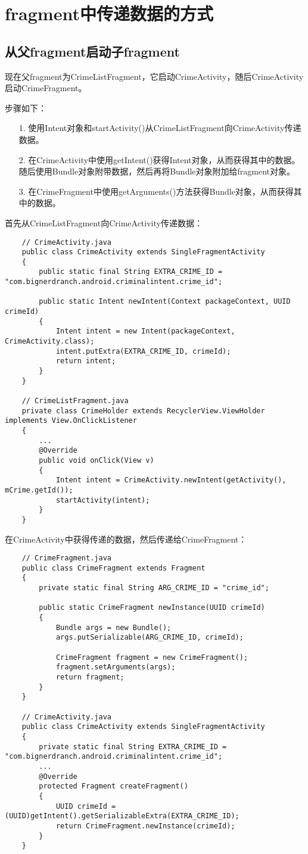 \documentclass[a4paper,left=2.5cm,right=2.5cm,11pt]{article}
\begin{document}


\section{fragment中传递数据的方式}
\subsection{从父fragment启动子fragment}
	现在父fragment为CrimeListFragment，它启动CrimeActivity，随后CrimeActivity启动CrimeFragment。\par

	步骤如下：
	\begin{itemize}
		\item[1.] 使用Intent对象和startActivity()从CrimeListFragment向CrimeActivity传递数据。
		\item[2.] 在CrimeActivity中使用getIntent()获得Intent对象，从而获得其中的数据。
		          随后使用Bundle对象附带数据，然后再将Bundle对象附加给fragment对象。
		\item[3.] 在CrimeFragment中使用getArguments()方法获得Bundle对象，从而获得其中的数据。
	\end{itemize}

	首先从CrimeListFragment向CrimeActivity传递数据：
	\begin{lstlisting}
	// CrimeActivity.java
	public class CrimeActivity extends SingleFragmentActivity
	{
		public static final String EXTRA_CRIME_ID = "com.bignerdranch.android.criminalintent.crime_id";

		public static Intent newIntent(Context packageContext, UUID crimeId)
		{
			Intent intent = new Intent(packageContext, CrimeActivity.class);
			intent.putExtra(EXTRA_CRIME_ID, crimeId);
			return intent;
		}
	}

	// CrimeListFragment.java
	private class CrimeHolder extends RecyclerView.ViewHolder implements View.OnClickListener
	{
		...
		@Override
		public void onClick(View v)
		{
			Intent intent = CrimeActivity.newIntent(getActivity(), mCrime.getId());
			startActivity(intent);
		}
	}
	\end{lstlisting}

	在CrimeActivity中获得传递的数据，然后传递给CrimeFragment：
	\begin{lstlisting}
	// CrimeFragment.java
	public class CrimeFragment extends Fragment
	{
		private static final String ARG_CRIME_ID = "crime_id";

		public static CrimeFragment newInstance(UUID crimeId)
		{
			Bundle args = new Bundle();
			args.putSerializable(ARG_CRIME_ID, crimeId);

			CrimeFragment fragment = new CrimeFragment();
			fragment.setArguments(args);
			return fragment;
		}
	}

	// CrimeActivity.java
	public class CrimeActivity extends SingleFragmentActivity
	{
		private static final String EXTRA_CRIME_ID = "com.bignerdranch.android.criminalintent.crime_id";
		...
		@Override
		protected Fragment createFragment()
		{
			UUID crimeId = (UUID)getIntent().getSerializableExtra(EXTRA_CRIME_ID);
			return CrimeFragment.newInstance(crimeId);
		}
	}
	\end{lstlisting}
\end{document}
